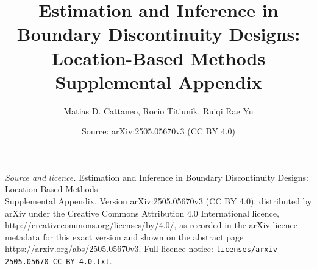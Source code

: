 \documentclass[10pt,a4paper]{amsart}
\title{Estimation and Inference in Boundary Discontinuity Designs: Location-Based Methods\\ Supplemental Appendix\bigskip}
\author{Matias D. Cattaneo, Rocio Titiunik, Ruiqi Rae Yu}
\date{Source: arXiv:2505.05670v3 (CC BY 4.0)}
\begin{document}
\maketitle

\noindent\emph{Source and licence.} Estimation and Inference in Boundary Discontinuity Designs: Location-Based Methods\\ Supplemental Appendix\bigskip. Version arXiv:2505.05670v3 (CC BY 4.0), distributed by arXiv under the Creative Commons Attribution 4.0 International licence, http://creativecommons.org/licenses/by/4.0/, as recorded in the arXiv licence metadata for this exact version and shown on the abstract page https://arxiv.org/abs/2505.05670v3. Full licence notice: \texttt{licenses/arxiv-2505.05670-CC-BY-4.0.txt}.\par\smallskip
\end{document}
